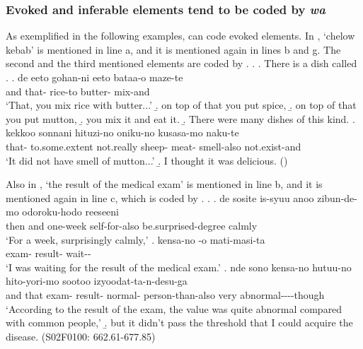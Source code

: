 \subsubsection{Evoked and inferable elements tend to be coded by \textit{wa}}

As exemplified in the following examples,
 can code evoked elements.
In \Next,
`chelow kebab' is mentioned in line a,
and it is mentioned again in lines b and g.
The second and the third mentioned elements are coded by .
%
\ex.\label{kebab}
 \a. There is a dish called .
 \bg. de  eeto gohan-ni eeto bataa-o maze-te \\
 	and that-  rice-to  butter- mix-and \\
	`That, you mix rice with butter...'
 \b. on top of that you put spice,
 \b. on top of that you put mutton,
 \b. you mix it and eat it.
 \b. There were many dishes of this kind.
 \bg.  kekkoo sonnani hituzi-no oniku-no kusasa-mo naku-te \\
 	that- to.some.extent not.really sheep- meat- smell-also not.exist-and \\
	`It did not have smell of mutton...'
 \b. I thought it was delicious.
 \hfill{()}

Also in \Next,
`the result of the medical exam' is mentioned in line b,
and it is mentioned again in line c, which is coded by .
%
\ex.\label{kensakekka}
 \ag. de sosite is-syuu anoo zibun-de-mo odoroku-hodo reeseeni \\
 	then and one-week  self-for-also be.surprised-degree calmly \\
	`For a week, surprisingly calmly,'
 \bg. kensa-no -o mati-masi-ta \\
 	exam- result- wait-- \\
	`I was waiting for the result of the medical exam.'
 \bg. nde sono kensa-no  hutuu-no hito-yori-mo sootoo izyoodat-ta-n-desu-ga \\
 	and that exam- result- normal- person-than-also very abnormal----though \\
 	`According to the result of the exam, the value was quite abnormal compared with common people,'
 \b. but it didn't pass the threshold that I could acquire the disease.
 \hfill{(S02F0100: 662.61-677.85)}


